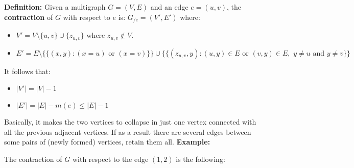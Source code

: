 \textbf{Definition:} Given a multigraph $G=(V,E)$ and an edge $e = (u, v)$, the \textbf{contraction} of $G$ with respect to $e$ is: $G_{/e} = (V', E')$ where:
\begin{itemize}
    \item $V' = V \setminus \{u, v\} \cup \{z_{u,v}\}$ where $z_{u,v} \notin V$.

    \item $E' = E \setminus \{\{ (x,y) : (x = u)\,\, \text{or}\,\, (x = v)\}\} \cup \{\{ (z_{u,v}, y) : (u, y) \in E \,\, \text{or} \,\, (v, y) \in E, \,\, y \neq u \,\, \text{and} \,\, y \neq v   \}\}$
\end{itemize}
It follows that:
\begin{itemize}
    \item $|V'| = |V| - 1$

    \item $|E'| = |E| - m(e) \leq |E| - 1$
\end{itemize}
Basically, it makes the two vertices to collapse in just one vertex connected with all the previous adjacent vertices. If as a result there are several edges between some pairs of (newly formed) vertices, retain them all.\newline\newline
\textbf{Example:}\newline\newline
{}\newline\newline
The contraction of $G$ with respect to the edge $(1,2)$ is the following:\newline\newline
{}\newline\newline
